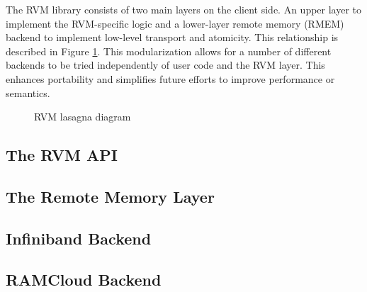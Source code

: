 The RVM library consists of two main layers on the client side. An upper layer
to implement the RVM-specific logic and a lower-layer remote memory (RMEM)
backend to implement low-level transport and atomicity. This relationship is
described in Figure \ref{fig:lasagna}. This modularization allows for a number of
different backends to be tried independently of user code and the RVM layer.
This enhances portability and simplifies future efforts to improve performance
or semantics.

\begin{figure}[t]
\begin{center}
\end{center}
\caption{RVM lasagna diagram}
\label{fig:lasagna}
\end{figure}

\subsection{The RVM API}



\subsection{The Remote Memory Layer}



\subsection{Infiniband Backend}



\subsection{RAMCloud Backend}


